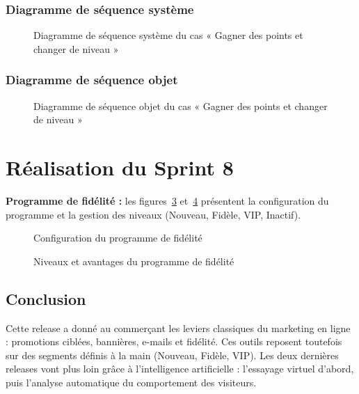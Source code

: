 \subsubsection{Diagramme de séquence système}
\begin{figure}[H]
    \centering
    \caption{Diagramme de séquence système du cas « Gagner des points et changer de niveau »}
    \label{fig:dss-fidelite}
\end{figure}

\subsubsection{Diagramme de séquence objet}
\begin{figure}[H]
    \centering
    \caption{Diagramme de séquence objet du cas « Gagner des points et changer de niveau »}
    \label{fig:dso-fidelite}
\end{figure}

\section{Réalisation du Sprint 8}
\textbf{Programme de fidélité :} les figures~\ref{fig:ui-fidelite-config} et~\ref{fig:ui-fidelite-niveaux} présentent la configuration du programme et la gestion des niveaux (Nouveau, Fidèle, VIP, Inactif).
\begin{figure}[H]
    \centering
    \caption{Configuration du programme de fidélité}
    \label{fig:ui-fidelite-config}
\end{figure}
\begin{figure}[H]
    \centering
    \caption{Niveaux et avantages du programme de fidélité}
    \label{fig:ui-fidelite-niveaux}
\end{figure}



\subsection*{Conclusion}
Cette release a donné au commerçant les leviers classiques du marketing en ligne : promotions ciblées, bannières, e-mails et fidélité. Ces outils reposent toutefois sur des segments définis à la main (Nouveau, Fidèle, VIP). Les deux dernières releases vont plus loin grâce à l'intelligence artificielle : l'essayage virtuel d'abord, puis l'analyse automatique du comportement des visiteurs.
